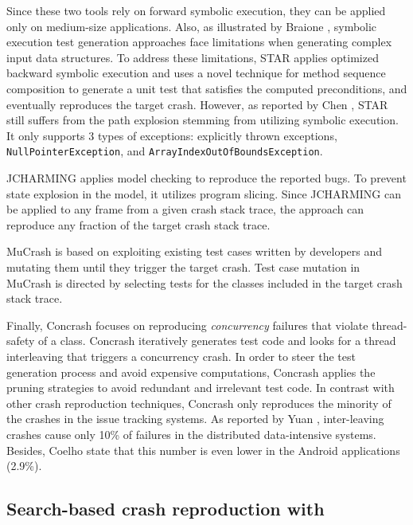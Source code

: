 Since these two tools rely on forward symbolic execution, they can be applied only on medium-size applications. Also, as illustrated by Braione \etal \cite{braione2017tardis}, symbolic execution test generation approaches face limitations when generating complex input data structures.
To address these limitations, \textrm{STAR} \cite{Chen2015} applies optimized backward symbolic execution and uses a novel technique for method sequence composition to generate a unit test that satisfies the computed preconditions, and eventually reproduces the target crash. 
However, as reported by Chen \etal \cite{Chen2015}, \textrm{STAR} still suffers from the path explosion stemming from utilizing symbolic execution. 
It only supports 3 types of exceptions: explicitly thrown exceptions, \texttt{NullPointerException}, and \texttt{ArrayIndexOutOfBoundsException}.  

\textrm{JCHARMING} \cite{Nayrolles2017} applies model checking to reproduce the reported bugs. To prevent state explosion in the model, it utilizes program slicing.
Since \textrm{JCHARMING} can be applied to any frame from a given crash stack trace, the approach can reproduce any fraction of the target crash stack trace. 

\textrm{MuCrash} \cite{Xuan2015} is based on exploiting existing test cases written by developers and mutating them until they trigger the target crash.
Test case mutation in \textrm{MuCrash} is directed by selecting tests for the classes included in the target crash stack trace. 

Finally, \textrm{Concrash} \cite{BPT17concrash} focuses on reproducing \textit{concurrency} failures that violate thread-safety of a class.
\textrm{Concrash} iteratively generates test code and looks for a thread interleaving that triggers a concurrency crash.
In order to steer the test generation process and avoid expensive computations, \textrm{Concrash} applies the pruning strategies to avoid redundant and irrelevant test code. In contrast with other crash reproduction techniques, \textrm{Concrash} only reproduces the minority of the crashes in the issue tracking systems. As reported by Yuan \etal \cite{Yuan2014}, inter-leaving crashes cause only 10\% of failures in the distributed data-intensive systems. Besides, Coelho \etal \cite{Coelho2015} state that this number is even lower in the Android applications (2.9\%).

\subsection{Search-based crash reproduction with \evocrash}

